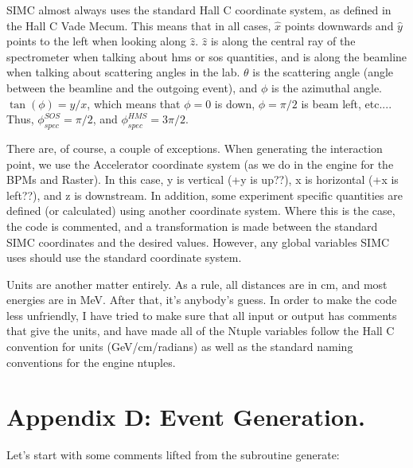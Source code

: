 SIMC almost always uses the standard Hall C coordinate system, as defined in
the Hall C Vade Mecum\cite{vademecum}.  This means that in all cases, $\hat{x}$ points
downwards and $\hat{y}$ points to the left when looking along $\hat{z}$. 
$\hat{z}$ is along the central ray of the spectrometer when talking about hms
or sos quantities, and is along the beamline when talking about scattering
angles in the lab.  $\theta$ is the scattering angle (angle between the beamline
and the outgoing event), and $\phi$ is the azimuthal angle.  $ \tan(\phi) =
y/x$, which means that $\phi = 0$ is down, $\phi= \pi /2$ is beam left, etc....
Thus, $\phi_{spec}^{SOS} = \pi /2$, and $\phi_{spec}^{HMS} = 3\pi /2$.

There are, of course, a couple of exceptions.  When generating the
interaction point, we use the Accelerator coordinate system (as we do
in the engine for the BPMs and Raster).  In this case, y is vertical
(+y is up??), x is horizontal (+x is left??), and z is downstream.
In addition, some experiment specific quantities are defined (or calculated)
using another coordinate system.  Where this is the case, the code is
commented, and a transformation is made between the standard SIMC coordinates
and the desired values.  However, any global variables SIMC uses should
use the standard coordinate system.

Units are another matter entirely.  As a rule, all distances are in cm,
and most energies are in MeV.  After that, it's anybody's guess.  In order
to make the code less unfriendly, I have tried to make sure that all input
or output has comments that give the units, and have made all of the Ntuple
variables follow the Hall C convention for units (GeV/cm/radians) as well as
the standard naming conventions for the engine ntuples.

\section{Appendix D: Event Generation.}

Let's start with some comments lifted from the subroutine generate:

